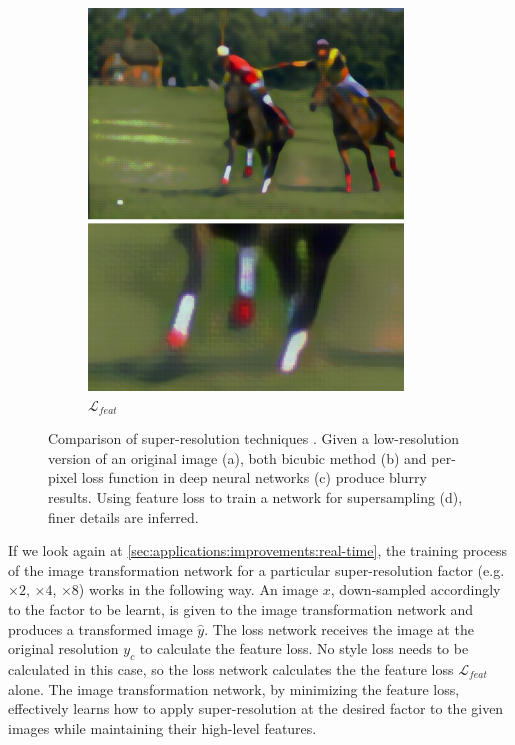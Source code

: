 \begin{figure}[t]
\begin{subfigure}[b]{0.244\textwidth}
    \includegraphics[width=\textwidth]{gfx/app-super-res-4}
    \caption{$\mathcal{L}_{feat}$}
  \end{subfigure}
  \caption{
    Comparison of super-resolution techniques \cite{Johnson2016}.
    Given a low-resolution version of an original image (a), both bicubic method (b) and per-pixel loss function in deep neural networks (c) produce blurry results.
    Using feature loss to train a network for supersampling (d), finer details are inferred.
  }
  \label{sec:applications:uses:super-res}
\end{figure}

If we look again at \autoref{sec:applications:improvements:real-time}, the training process of the image transformation network for a particular super-resolution factor (e.g. $\times{2}$, $\times{4}$, $\times{8}$) works in the following way.
An image $x$, down-sampled accordingly to the factor to be learnt, is given to the image transformation network and produces a transformed image $\hat{y}$.
The loss network receives the image at the original resolution $y_c$ to calculate the feature loss.
No style loss needs to be calculated in this case, so the loss network calculates the the feature loss $\mathcal{L}_{feat}$ alone.
The image transformation network, by minimizing the feature loss, effectively learns how to apply super-resolution at the desired factor to the given images while maintaining their high-level features.


